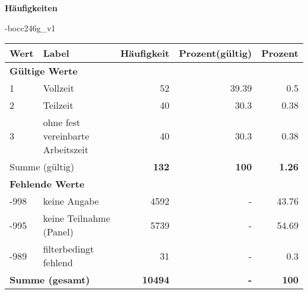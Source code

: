         		\vspace*{0.5cm}
                \noindent\textbf{Häufigkeiten}

                \vspace*{-\baselineskip}
					\begin{filecontents}{\jobname-bocc246g_v1}
					\begin{longtable}{lXrrr}
					\toprule
					\textbf{Wert} & \textbf{Label} & \textbf{Häufigkeit} & \textbf{Prozent(gültig)} & \textbf{Prozent} \\
					\endhead
					\midrule
					\multicolumn{5}{l}{\textbf{Gültige Werte}}\\

					1 &
					\multicolumn{1}{X}{ Vollzeit   } &


					  \num{52} &
					  \num[round-mode=places,round-precision=2]{39,39} &
					    \num[round-mode=places,round-precision=2]{0,5} \\

					2 &
					\multicolumn{1}{X}{ Teilzeit   } &


					  \num{40} &
					  \num[round-mode=places,round-precision=2]{30,3} &
					    \num[round-mode=places,round-precision=2]{0,38} \\

					3 &
					\multicolumn{1}{X}{ ohne fest vereinbarte Arbeitszeit   } &


					  \num{40} &
					  \num[round-mode=places,round-precision=2]{30,3} &
					    \num[round-mode=places,round-precision=2]{0,38} \\
					\midrule
					\multicolumn{2}{l}{Summe (gültig)} &
					  \textbf{\num{132}} &
					\textbf{100} &
					  \textbf{\num[round-mode=places,round-precision=2]{1,26}} \\
					\multicolumn{5}{l}{\textbf{Fehlende Werte}}\\
							-998 &
							keine Angabe &
							  \num{4592} &
							 - &
							  \num[round-mode=places,round-precision=2]{43,76} \\
							-995 &
							keine Teilnahme (Panel) &
							  \num{5739} &
							 - &
							  \num[round-mode=places,round-precision=2]{54,69} \\
							-989 &
							filterbedingt fehlend &
							  \num{31} &
							 - &
							  \num[round-mode=places,round-precision=2]{0,3} \\
					\midrule
					\multicolumn{2}{l}{\textbf{Summe (gesamt)}} &
				      \textbf{\num{10494}} &
				    \textbf{-} &
				    \textbf{100} \\
					\bottomrule
					\end{longtable}
					\end{filecontents}
